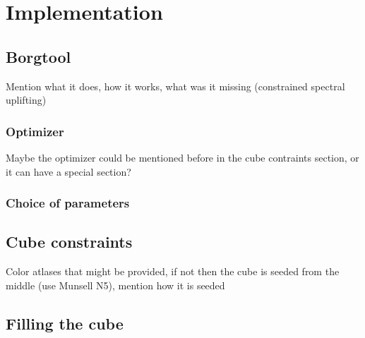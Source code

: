 \chapter{Implementation}

\section{Borgtool}

Mention what it does, how it works, what was it missing (constrained spectral uplifting)

\subsection{Optimizer}
Maybe the optimizer could be mentioned before in the cube contraints section, or it can have a special section?

\subsection{Choice of parameters}

\section{Cube constraints}

Color atlases that might be provided, if not then the cube is seeded from the middle (use Munsell N5), mention how it is seeded

\section{Filling the cube}